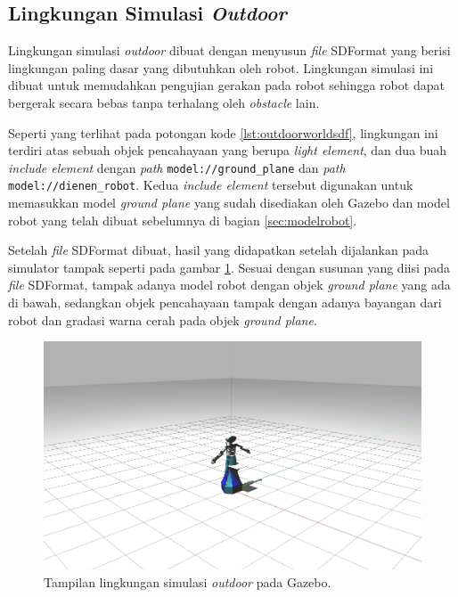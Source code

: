 \subsection{Lingkungan Simulasi \emph{Outdoor}}
\label{subsec:lingkunganoutdoor}

Lingkungan simulasi \emph{outdoor} dibuat dengan menyusun \emph{file} SDFormat yang berisi lingkungan paling dasar yang dibutuhkan oleh robot.
Lingkungan simulasi ini dibuat untuk memudahkan pengujian gerakan pada robot sehingga robot dapat bergerak secara bebas tanpa terhalang oleh \emph{obstacle} lain.

Seperti yang terlihat pada potongan kode \ref{lst:outdoorworldsdf},
  lingkungan ini terdiri atas sebuah objek pencahayaan yang berupa \emph{light element},
  dan dua buah \emph{include element} dengan \emph{path} \lstinline{model://ground_plane} dan \emph{path} \lstinline{model://dienen_robot}.
Kedua \emph{include element} tersebut digunakan untuk memasukkan model \emph{ground plane} yang sudah disediakan oleh Gazebo dan model robot yang telah dibuat sebelumnya di bagian \ref{sec:modelrobot}.



Setelah \emph{file} SDFormat dibuat,
  hasil yang didapatkan setelah dijalankan pada simulator tampak seperti pada gambar \ref{fig:lingkunganoutdoor}.
Sesuai dengan susunan yang diisi pada \emph{file} SDFormat,
  tampak adanya model robot dengan objek \emph{ground plane} yang ada di bawah,
  sedangkan objek pencahayaan tampak dengan adanya bayangan dari robot dan gradasi warna cerah pada objek \emph{ground plane}.

\begin{figure}[ht]
  \centering
  \includegraphics[scale=0.23]{gambar/lingkungan-outdoor.png}
  \caption{Tampilan lingkungan simulasi \emph{outdoor} pada Gazebo.}
  \label{fig:lingkunganoutdoor}
\end{figure}
